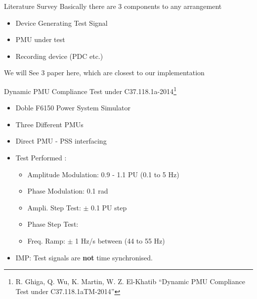 \documentclass{beamer}
\begin{document}

\begin{frame}{Literature Survey}
Basically there are 3 components to any arrangement
\begin{itemize}
\item Device Generating Test Signal
\item PMU under test
\item Recording device (PDC etc.)
\end{itemize}

We will See 3 paper here, which are closest to our implementation
\end{frame}

\begin{frame}{Dynamic PMU Compliance Test under C37.118.1a-2014\footnote{R. Ghiga, Q. Wu, K. Martin, W. Z. El-Khatib “Dynamic PMU Compliance
Test under C37.118.1aTM-2014”}}

\begin{itemize}
\item Doble F6150 Power System Simulator
\item Three Different PMUs
\item Direct PMU - PSS interfacing
\item Test Performed \cite{Paper:ghiga} : 

\begin{itemize}
	\item Amplitude Modulation: 0.9 - 1.1 PU (\@ 0.1 to 5 Hz)
	\item Phase Modulation: 0.1 rad
	\item Ampli. Step Test: $\pm$ 0.1 PU step
	\item Phase Step Test: 
	\item Freq. Ramp: $\pm$ 1 Hz/s between (44 to 55 Hz)
\end{itemize}
\item IMP: Test signals are \textbf{not} time synchronised.
\end{itemize}

\end{frame}
\end{document}
